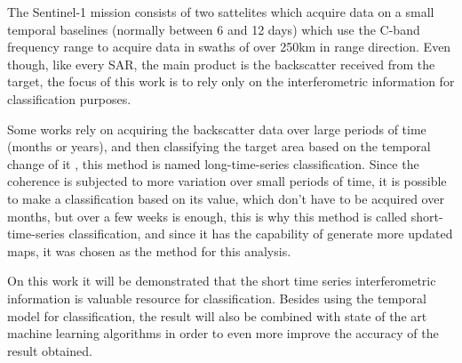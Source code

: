 The Sentinel-1 mission consists of two sattelites which acquire data on a small temporal baselines (normally between 6 and 12 days) which use the C-band frequency range to acquire data in swaths of over 250km in range direction. Even though, like every SAR, the main product is the backscatter received from the target, the focus of this work is to rely only on the interferometric information for classification purposes. 

Some works rely on acquiring the backscatter data over large periods of time (months or years), and then classifying the target area based on the temporal change of it \cite{long_time_series}, this method is named long-time-series classification. Since the coherence is subjected to more variation over small periods of time, it is possible to make a classification based on its value, which don't have to be acquired over months, but over a few weeks is enough, this is why this method is called short-time-series classification, and since it has the capability of generate more updated maps, it was chosen as the method for this analysis. 

On this work it will be demonstrated that the short time series interferometric information is valuable resource for classification. Besides using the temporal model for classification, the result will also be combined with state of the art machine learning algorithms in order to even more improve the accuracy of the result obtained. 

